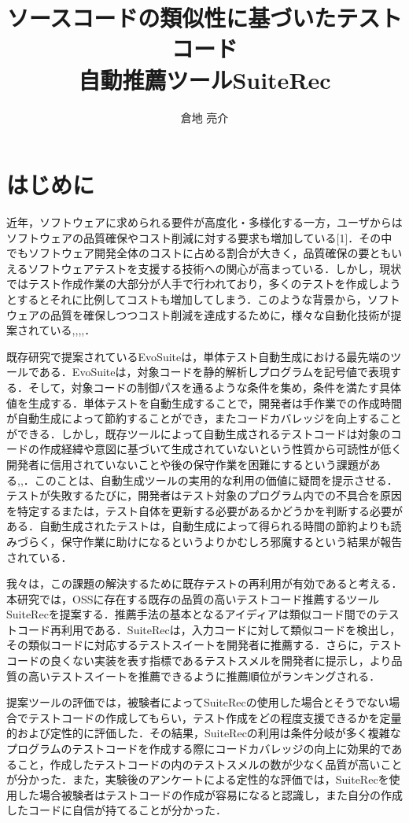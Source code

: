 \documentclass[12pt]{jarticle} %
\title{ソースコードの類似性に基づいたテストコード\\自動推薦ツールSuiteRec}
\author{倉地 亮介}
\begin{document}
%
%
\titlepage
\cmemberspage
\firstabstract
\secondabstract
%
%
\toc
\newpage
\listoffigures
\listoftables
%
%
\newpage
\section{はじめに}
近年，ソフトウェアに求められる要件が高度化・多様化する一方，ユーザからはソフトウェアの品質確保やコスト削減に対する要求も増加している[1]．その中でもソフトウェア開発全体のコストに占める割合が大きく，品質確保の要ともいえるソフトウェアテストを支援する技術への関心が高まっている\cite{b20}．しかし，現状ではテスト作成作業の大部分が人手で行われており，多くのテストを作成しようとするとそれに比例してコストも増加してしまう．このような背景から，ソフトウェアの品質を確保しつつコスト削減を達成するために，様々な自動化技術が提案されている\cite{b3},\cite{b16},\cite{b17},\cite{b18},\cite{b19}．

既存研究で提案されているEvoSuite\cite{b3}は，単体テスト自動生成における最先端のツールである．EvoSuiteは，対象コードを静的解析しプログラムを記号値で表現する．そして，対象コードの制御パスを通るような条件を集め，条件を満たす具体値を生成する．単体テストを自動生成することで，開発者は手作業での作成時間が自動生成によって節約することができ，またコードカバレッジを向上することができる．しかし，既存ツールによって自動生成されるテストコードは対象のコードの作成経緯や意図に基づいて生成されていないという性質から可読性が低く開発者に信用されていないことや後の保守作業を困難にするという課題がある\cite{b13},\cite{b14},\cite{b15}．このことは、自動生成ツールの実用的な利用の価値に疑問を提示させる．テストが失敗するたびに，開発者はテスト対象のプログラム内での不具合を原因を特定するまたは，テスト自体を更新する必要があるかどうかを判断する必要がある．自動生成されたテストは，自動生成によって得られる時間の節約よりも読みづらく，保守作業に助けになるというよりかむしろ邪魔するという結果が報告されている\cite{b1}．

我々は，この課題の解決するために既存テストの再利用が有効であると考える．本研究では，OSSに存在する既存の品質の高いテストコード推薦するツール{\sf SuiteRec}を提案する．推薦手法の基本となるアイディアは類似コード間でのテストコード再利用である．{\sf SuiteRec}は，入力コードに対して類似コードを検出し，その類似コードに対応するテストスイートを開発者に推薦する．さらに，テストコードの良くない実装を表す指標であるテストスメルを開発者に提示し，より品質の高いテストスイートを推薦できるように推薦順位がランキングされる．

提案ツールの評価では，被験者によって{\sf SuiteRec}の使用した場合とそうでない場合でテストコードの作成してもらい，テスト作成をどの程度支援できるかを定量的および定性的に評価した．その結果，{\sf SuiteRec}の利用は条件分岐が多く複雑なプログラムのテストコードを作成する際にコードカバレッジの向上に効果的であること，作成したテストコードの内のテストスメルの数が少なく品質が高いことが分かった．また，実験後のアンケートによる定性的な評価では，{\sf SuiteRec}を使用した場合被験者はテストコードの作成が容易になると認識し，また自分の作成したコードに自信が持てることが分かった．
\end{document}
